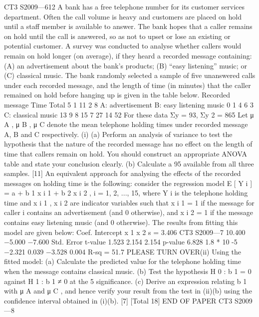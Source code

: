 \documentclass[a4paper,12pt]{article}
\begin{document}
\begin{enumerate}

CT3 S2009—612
A bank has a free telephone number for its customer services department. Often the
call volume is heavy and customers are placed on hold until a staff member is
available to answer. The bank hopes that a caller remains on hold until the call is
answered, so as not to upset or lose an existing or potential customer.
A survey was conducted to analyse whether callers would remain on hold longer (on
average), if they heard a recorded message containing: (A) an advertisement about the
bank’s products; (B) “easy listening” music; or (C) classical music. The bank
randomly selected a sample of five unanswered calls under each recorded message,
and the length of time (in minutes) that the caller remained on hold before hanging up
is given in the table below.
Recorded message
Time
Total
5 1 11 2 8
A: advertisement
B: easy listening music 0 1 4 6 3
C: classical music
13 9 8 15 7
27
14
52
For these data Σy = 93, Σy 2 = 865
Let μ A , μ B , μ C denote the mean telephone holding times under recorded message A,
B and C respectively.
(i)
(a) Perform an analysis of variance to test the hypothesis that the nature of
the recorded message has no effect on the length of time that callers
remain on hold. You should construct an appropriate ANOVA table
and state your conclusion clearly.
(b) Calculate a 95%
available from all three samples.
[11]
An equivalent approach for analysing the effects of the recorded messages on holding
time is the following:
consider the regression model E [ Y i ] = a + b 1 x i 1 + b 2 x i 2 , i = 1, 2, ..., 15, where
Y i is the telephone holding time and x i 1 , x i 2 are indicator variables such that
x i 1 = 1 if the message for caller i contains an advertisement (and 0 otherwise),
and x i 2 = 1 if the message contains easy listening music (and 0 otherwise).
The results from fitting this model are given below:
Coef.
Intercept
x 1
x 2
s = 3.406
CT3 S2009—7
10.400
−5.000
−7.600
Std. Error t-value
1.523
2.154
2.154
p-value
6.828 1.8 * 10 -5
−2.321
0.039
−3.528
0.004
R-sq = 51.7%
PLEASE TURN OVER(ii)
Using the fitted model:
(a) Calculate the predicted value for the telephone holding time when the
message contains classical music.
(b) Test the hypothesis H 0 : b 1 = 0 against H 1 : b 1 ≠ 0 at the 5%
significance.
(c) Derive an expression relating b 1 with μ A and μ C , and hence verify
your result from the test in (ii)(b) using the confidence interval
obtained in (i)(b).
[7]
[Total 18]
END OF PAPER
CT3 S2009—8


\end{enumerate}
\end{document}
